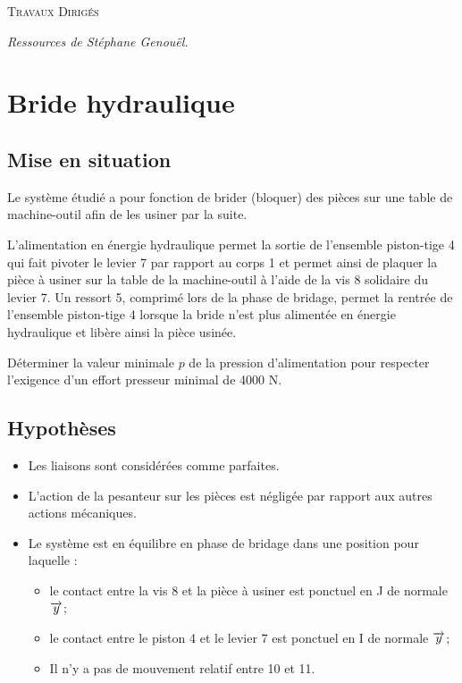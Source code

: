 \documentclass[10pt]{article}
\begin{document}

\begin{center}
\large{\textsc{Travaux Dirigés}}
\end{center}

\begin{flushright}
\textit{Ressources de Stéphane Genouël.}
\end{flushright}



\section*{Bride hydraulique}

\subsection*{Mise en situation}
Le système étudié a pour fonction de brider (bloquer) des pièces 
sur une table de machine-outil afin de les usiner par la suite. 

 L’alimentation en énergie hydraulique 
permet la sortie de l’ensemble piston-tige 4 
qui fait pivoter le levier 7 par rapport au 
corps 1 et permet ainsi de plaquer la pièce 
à usiner sur la table de la machine-outil à 
l’aide de la vis 8 solidaire du levier 7. 
Un ressort 5, comprimé lors de la phase de 
bridage, permet la rentrée de l’ensemble 
piston-tige 4 lorsque la bride n’est plus 
alimentée en énergie hydraulique et libère 
ainsi la pièce usinée.
 
 \begin{obj}
 Déterminer la valeur minimale 
$p$ de la pression d’alimentation pour respecter l'exigence d'un effort presseur minimal de 4000 N.  

 \end{obj}
 
 \subsection*{Hypothèses}
 
\begin{itemize}
\item Les liaisons sont considérées comme parfaites. 
\item L’action de la pesanteur sur les pièces est négligée par rapport aux autres actions mécaniques. 
\item Le système est en équilibre en phase de bridage dans une position pour laquelle : 
\begin{itemize}
\item le contact entre la vis 8 et la pièce à usiner est ponctuel en J de normale $\overrightarrow{y}$; 
\item le contact entre le piston 4 et le levier 7 est ponctuel en I de normale $\overrightarrow{y}$; 
\item Il n’y a pas de mouvement relatif entre 10 et 11. 
\end{itemize}
\end{itemize}
\end{document}
